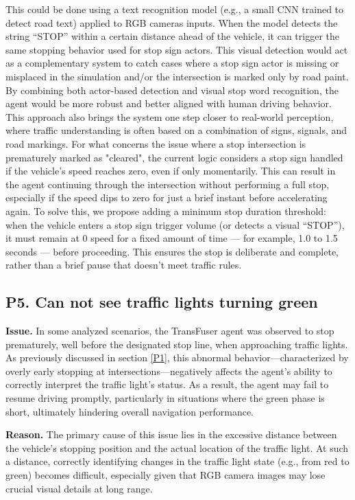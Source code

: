 This could be done using a text recognition model (e.g., a small CNN trained to detect road text) applied to RGB cameras inputs. When the model detects the string “STOP” within a certain distance ahead of the vehicle, it can trigger the same stopping behavior used for stop sign actors. 
This visual detection would act as a complementary system to catch cases where a stop sign actor is missing or misplaced in the simulation and/or the intersection is marked only by road paint.
By combining both actor-based detection and visual stop word recognition, the agent would be more robust and better aligned with human driving behavior. This approach also brings the system one step closer to real-world perception, where traffic understanding is often based on a combination of signs, signals, and road markings.
For what concerns the issue where a stop intersection is prematurely marked as "cleared", the current logic considers a stop sign handled if the vehicle's speed reaches zero, even if only momentarily. This can result in the agent continuing through the intersection without performing a full stop, especially if the speed dips to zero for just a brief instant before accelerating again. 
To solve this, we propose adding a minimum stop duration threshold: when the vehicle enters a stop sign trigger volume (or detects a visual “STOP”), it must remain at 0 speed for a fixed amount of time — for example, 1.0 to 1.5 seconds — before proceeding. This ensures the stop is deliberate and complete, rather than a brief pause that doesn't meet traffic rules.

\subsection{P5. Can not see traffic lights turning green}
\noindent\textbf{Issue.} In some analyzed scenarios, the TransFuser agent was observed to stop prematurely, well before the designated stop line, when approaching traffic lights. As previously discussed in section \ref{P1}, this abnormal behavior—characterized by overly early stopping at intersections—negatively affects the agent’s ability to correctly interpret the traffic light’s status. As a result, the agent may fail to resume driving promptly, particularly in situations where the green phase is short, ultimately hindering overall navigation performance.

\noindent\textbf{Reason.} The primary cause of this issue lies in the excessive distance between the vehicle’s stopping position and the actual location of the traffic light. At such a distance, correctly identifying changes in the traffic light state (e.g., from red to green) becomes difficult, especially given that RGB camera images may lose crucial visual details at long range.

